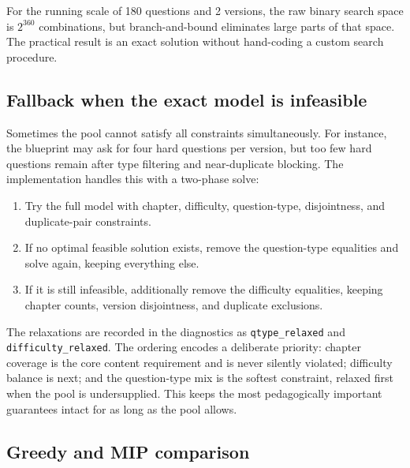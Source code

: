 \documentclass[11pt,a4paper]{article}
\newcommand{\code}[1]{\texttt{\small #1}}
\begin{document}
For the running scale of 180 questions and 2 versions, the raw binary search
space is $2^{360}$ combinations, but branch-and-bound eliminates large parts of
that space. The practical result is an exact solution without hand-coding a
custom search procedure.

\subsection{Fallback when the exact model is infeasible}

Sometimes the pool cannot satisfy all constraints simultaneously. For instance,
the blueprint may ask for four hard questions per version, but too few hard
questions remain after type filtering and near-duplicate blocking. The
implementation handles this with a two-phase solve:

\begin{enumerate}[leftmargin=1.6em]
  \item Try the full model with chapter, difficulty, question-type,
        disjointness, and duplicate-pair constraints.
  \item If no optimal feasible solution exists, remove the question-type
        equalities and solve again, keeping everything else.
  \item If it is still infeasible, additionally remove the difficulty
        equalities, keeping chapter counts, version disjointness, and duplicate
        exclusions.
\end{enumerate}

The relaxations are recorded in the diagnostics as \code{qtype\_relaxed} and
\code{difficulty\_relaxed}. The ordering encodes a deliberate priority:
chapter coverage is the core content requirement and is never silently
violated; difficulty balance is next; and the question-type mix is the softest
constraint, relaxed first when the pool is undersupplied. This keeps the most
pedagogically important guarantees intact for as long as the pool allows.

\subsection{Greedy and MIP comparison}
\end{document}
